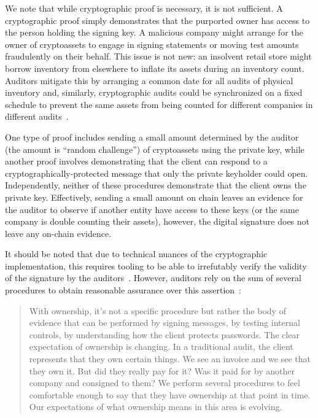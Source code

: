 We note that while cryptographic proof is necessary, it is not sufficient. A cryptographic proof simply demonstrates that the purported owner has access to the person holding the signing key. A malicious company might arrange for the owner of cryptoassets to engage in signing statements or moving test amounts fraudulently on their behalf. This issue is not new: an insolvent retail store might borrow inventory from elsewhere to inflate its assets during an inventory count. Auditors mitigate this by arranging a common date for all audits of physical inventory and, similarly, cryptographic audits could be synchronized on a fixed schedule to prevent the same assets from being counted for different companies in different audits~\cite{dagher2015provisions}. 

One type of proof includes sending a small amount determined by the auditor (the amount is ``random challenge'') of cryptoassets using the private key, while another proof involves demonstrating that the client can respond to a cryptographically-protected message that only the private keyholder could open. Independently, neither of these procedures demonstrate that the client owns the private key. Effectively, sending a small amount on chain leaves an evidence for the auditor to observe if another entity have access to these keys (or the same company is double counting their assets), however, the digital signature does not leave any on-chain evidence. 


It should be noted that due to technical nuances of the cryptographic implementation, this requires tooling to be able to irrefutably verify the validity of the signature by the auditors~\cite{gavinwrightcourt}. However, auditors rely on the sum of several procedures to obtain reasonable assurance over this assertion~\cite{pimentel2021systemizing}: 


\begin{quote}
With ownership, it's not a specific procedure but rather the body of evidence that can be performed by signing messages, by testing internal controls, by understanding how the client protects passwords. The clear expectation of ownership is changing. In a traditional audit, the client represents that they own certain things. We see an invoice and we see that they own it. But did they really pay for it? Was it paid for by another company and consigned to them? We perform several procedures to feel comfortable enough to say that they have ownership at that point in time. Our expectations of what ownership means in this area is evolving.
\end{quote}

